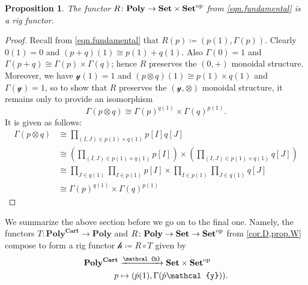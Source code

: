 \documentclass[11pt, one side, article]{memoir}
\theoremstyle{definition}
\theoremstyle{plain}
\newtheorem{proposition}[definitionx]{Proposition}
\newenvironment{remark}
  {\pushQED{\qed}\renewcommand{\qedsymbol}{$\lozenge$}\remarkx}
  {\popQED\endremarkx}
\newcommand{\Cat}[1]{\mathbf{#1}}%
\newcommand{\To}[2][]{\xrightarrow[#1]{#2}}
\newcommand{\op}{^\tn{op}}
\newcommand{\tn}[1]{\textnormal{#1}}
\newcommand{\smset}{\Cat{Set}}
\newcommand{\yon}{\mathcal{y}}
\newcommand{\poly}{\Cat{Poly}}
\newcommand{\polycart}{\poly^{\Cat{Cart}}}
\newcommand{\hh}{\mathcal{h}}
\newcommand{\0}{\textsf{0}}
\newcommand{\1}{\tn{\textsf{1}}}
\newcommand{\R}{R}
\newcommand{\T}{T}
\newcommand{\qqand}{\qquad\text{and}\qquad}
\begin{document}
\begin{proposition}\label{prop.W}
The functor $\R\colon\poly\to\smset\times\smset\op$ from \eqref{eqn.fundamental} is a rig functor.
\end{proposition}
\begin{proof}
Recall from \eqref{eqn.fundamental} that $\R(p)\coloneqq(p(1),\Gamma(p))$. Clearly $0(1)=0$ and $(p+q)(1)\cong p(1)+q(1)$. Also $\Gamma(0)=1$ and $\Gamma(p+q)\cong\Gamma(p)\times\Gamma(q)$; hence $\R$ preserves the $(0,+)$ monoidal structure. Moreover, we have $\yon(1)=1$ and $(p\otimes q)(1)\cong p(1)\times q(1)$ and $\Gamma(\yon)= 1$, so to show that $\R$ preserves the $(\yon,\otimes)$ monoidal structure, it remains only to provide an isomorphism 
\[
  \Gamma(p\otimes q)\cong \Gamma(p)^{q(1)}\times\Gamma(q)^{p(1)}.
\]
It is given as follows:
\begin{align*}
	\Gamma(p\otimes q)&\cong
	\prod_{(I,J)\in p(1)\times q(1)}p[I]q[J]\\&\cong
	\left(\prod_{(I,J)\in p(1)\times q(1)}p[I]\right)\times
		\left(\prod_{(I,J)\in p(1)\times q(1)}q[J]\right)\\&\cong
	\prod_{J\in q(1)}\prod_{I\in p(1)}p[I]\times\prod_{I\in p(1)}\prod_{J\in q(1)}q[J]\\&\cong
	\Gamma(p)^{q(1)}\times\Gamma(q)^{p(1)}	
\end{align*}
\end{proof}



We summarize the above section before we go on to the final one. Namely, the functors $\T\colon\polycart\to\poly$ and $\R\colon\poly\to\smset\to\smset\op$ from \cref{cor.D,prop.W} compose to form a rig functor $\hh\coloneqq \R\circ \T$ given by
\begin{equation}\label{eqn.entropy_data}
\begin{aligned}
	\polycart&\To{\mathcal{h}}\smset\times\smset\op\\
	p&\mapsto (\dot{p}(1),\Gamma(\dot{p}\yon)).
\end{aligned}
\end{equation}
\end{document}
